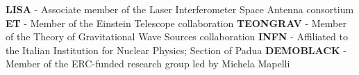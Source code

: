 %
%
%


\begin{contents}
					{\textbf{LISA} - Associate member of the Laser Interferometer Space Antenna consortium}	{}
					{\textbf{ET} - Member of the Einstein Telescope collaboration}{}
					{\textbf{TEONGRAV} - Member of the Theory of Gravitational Wave Sources collaboration}{}
					{\textbf{INFN}	- Affiliated to the Italian Institution for Nuclear Physics; Section of Padua}{}
					{\textbf{DEMOBLACK} - Member of the ERC-funded research group led by Michela Mapelli }{}
\end{contents}
\medskip
